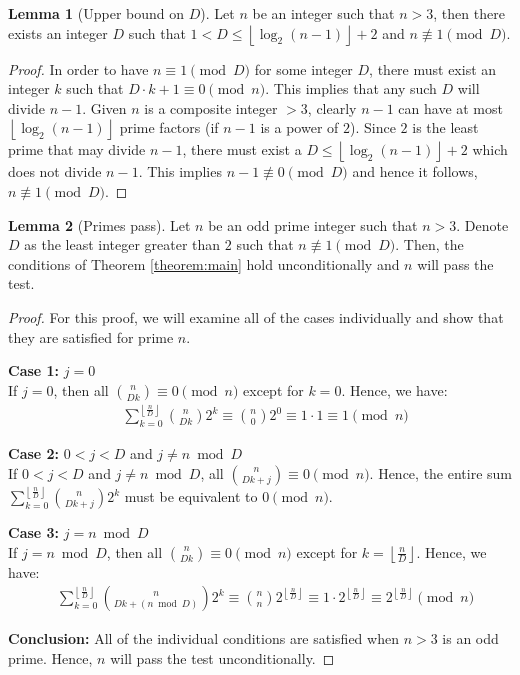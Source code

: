 \documentclass{article}
\theoremstyle{plain}
\theoremstyle{definition}
\newtheorem{lemma}{Lemma}
\newcommand{\floor}[1]{\left\lfloor #1 \right\rfloor}
\begin{document}
\begin{lemma}[Upper bound on $D$] \label{lemma:leastd}
Let $n$ be an integer such that $n > 3$, then there exists an integer $D$ such that $1 < D \leq \floor{\log_2(n-1)} + 2$ and $n \not\equiv 1 \pmod{D}$.
\end{lemma}
\begin{proof}
In order to have $n \equiv 1 \pmod{D}$ for some integer $D$, there must exist an integer $k$ such that $D \cdot k + 1 \equiv 0 \pmod{n}$. This implies that any such $D$ will divide $n-1$. Given $n$ is a composite integer $> 3$, clearly $n-1$ can have at most $\floor{\log_2(n-1)}$ prime factors (if $n-1$ is a power of $2$). Since $2$ is the least prime that may divide $n-1$, there must exist a $D \leq \floor{\log_2(n-1)} + 2$ which does not divide $n-1$. This implies $n-1 \not\equiv 0 \pmod{D}$ and hence it follows, $n \not\equiv 1 \pmod{D}$.
\end{proof}

\begin{lemma}[Primes pass] \label{lemma:primes}
Let $n$ be an odd prime integer such that $n > 3$. Denote $D$ as the least integer greater than $2$ such that $n \not\equiv 1 \pmod{D}$. Then, the conditions of Theorem \ref{theorem:main} hold unconditionally and $n$ will pass the test.
\end{lemma}
\begin{proof}
For this proof, we will examine all of the cases individually and show that they are satisfied for prime $n$.

\textbf{Case 1:} $j=0$ \\
If $j = 0$, then all $\binom{n}{D k} \equiv 0 \pmod{n}$ except for $k=0$. Hence, we have:
\begin{align}
    & \sum_{k=0}^{\floor{\frac{n}{D}}} \binom{n}{D k} 2^{k} \equiv \binom{n}{0} 2^{0} \equiv 1 \cdot 1 \equiv 1 \pmod{n}
\end{align}

\textbf{Case 2:} $0 < j < D$ and $j \neq n \bmod{D}$ \\
If $0 < j < D$ and $j \neq n \bmod{D}$, all $\binom{n}{D k + j} \equiv 0 \pmod{n}$. Hence, the entire sum $\sum_{k=0}^{\floor{\frac{n}{D}}} \binom{n}{D k + j} 2^{k}$ must be equivalent to $0 \pmod{n}$.

\textbf{Case 3:} $j=n \bmod{D}$ \\
If $j = n \bmod{D}$, then all $\binom{n}{D k} \equiv 0 \pmod{n}$ except for $k=\floor{\frac{n}{D}}$. Hence, we have:
\begin{align}
    & \sum_{k=0}^{\floor{\frac{n}{D}}} \binom{n}{D k + (n \bmod{D})} 2^{k} \equiv \binom{n}{n} 2^{\floor{\frac{n}{D}}} \equiv 1 \cdot 2^{\floor{\frac{n}{D}}} \equiv 2^{\floor{\frac{n}{D}}} \pmod{n}
\end{align}

\textbf{Conclusion:}
All of the individual conditions are satisfied when $n > 3$ is an odd prime. Hence, $n$ will pass the test unconditionally.
\end{proof}
\end{document}
